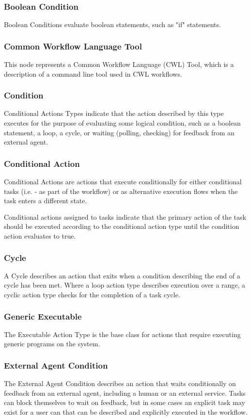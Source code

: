 			\subsubsection{
			Boolean Condition
			}
			Boolean Conditions evaluate boolean statements, such as "if" statements.
			\subsubsection{
			Common Workflow Language Tool
			}
			This node represents a Common Workflow Language (CWL) Tool, which is a description of a command line tool used in CWL workflows.
			\subsubsection{
			Condition
			}
			Conditional Actions Types indicate that the action described by this type executes for the purpose of evaluating some logical condition, such as a boolean statement, a loop, a cycle, or waiting (polling, checking) for feedback from an external agent.
			\subsubsection{
			Conditional Action
			}
			Conditional Actions are actions that execute conditionally for either conditional tasks (i.e. - as part of the workflow) or as alternative execution flows when the task enters a different state.

Conditional actions assigned to tasks indicate that the primary action of the task should be executed according to the conditional action type until the condition action evaluates to true.
			\subsubsection{
			Cycle
			}
			A Cycle describes an action that exits when a condition describing the end of a cycle has been met. Where a loop action type describes execution over a range, a cyclic action type checks for the completion of a task cycle.
			\subsubsection{
			Generic Executable
			}
			The Executable Action Type is the base class for actions that require executing generic programs on the system.
			\subsubsection{
			External Agent Condition
			}
			The External Agent Condition describes an action that waits conditionally on feedback from an external agent, including a human or an external service. Tasks can block themselves to wait on feedback, but in some cases an explicit task may exist for a user can that can be described and explicitly executed in the workflow.
